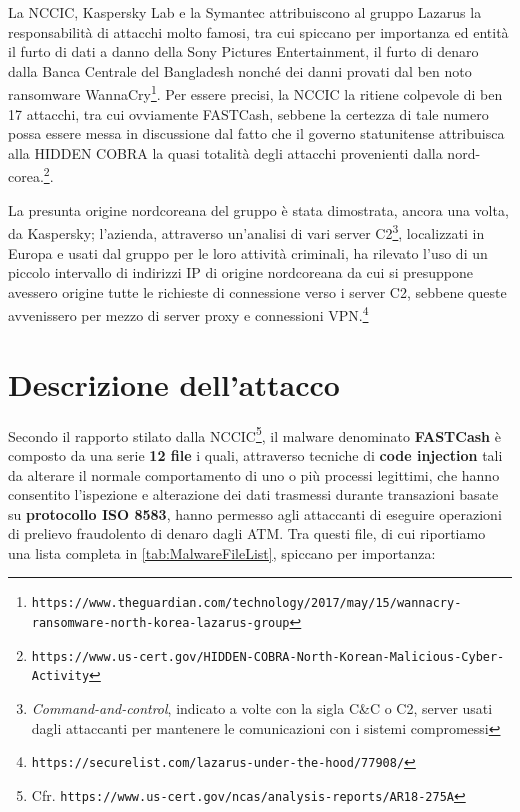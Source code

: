 \documentclass[10pt,a4paper, titlepage]{report}
\begin{document}
La NCCIC, Kaspersky Lab e la Symantec attribuiscono al gruppo Lazarus la responsabilità di attacchi molto famosi, tra cui spiccano per importanza ed entità il furto di dati a danno della Sony Pictures Entertainment, il furto di denaro dalla Banca Centrale del Bangladesh nonché dei danni provati dal ben noto ransomware WannaCry\footnote{\texttt{https://www.theguardian.com/technology/2017/may/15/wannacry-ransomware-north-korea-lazarus-group}}. Per essere precisi, la NCCIC la ritiene colpevole di ben 17 attacchi, tra cui ovviamente FASTCash, sebbene la certezza di tale numero possa essere messa in discussione dal fatto che il governo statunitense attribuisca alla HIDDEN COBRA la quasi totalità degli attacchi provenienti dalla nord-corea.\footnote{\texttt{https://www.us-cert.gov/HIDDEN-COBRA-North-Korean-Malicious-Cyber-Activity}}.

La presunta origine nordcoreana del gruppo è stata dimostrata, ancora una volta, da Kaspersky; l'azienda, attraverso un'analisi di vari server C2\footnote{\textit{Command-and-control}, indicato a volte con la sigla C\&C o C2, server usati dagli attaccanti per mantenere le comunicazioni con i sistemi compromessi}, localizzati in Europa e usati dal gruppo per le loro attività criminali, ha rilevato l'uso di un piccolo intervallo di indirizzi IP di origine nordcoreana da cui si presuppone avessero origine tutte le richieste di connessione verso i server C2, sebbene queste avvenissero per mezzo di server proxy e connessioni VPN.\footnote{\texttt{https://securelist.com/lazarus-under-the-hood/77908/}}


\chapter{Descrizione dell'attacco}


Secondo il rapporto stilato dalla NCCIC\footnote{Cfr. \texttt{https://www.us-cert.gov/ncas/analysis-reports/AR18-275A}}, il malware denominato \textbf{FASTCash} è composto da una serie \textbf{12 file} i quali, attraverso tecniche di \textbf{code injection} tali da alterare il normale comportamento di uno o più processi legittimi, che hanno consentito l'ispezione e alterazione dei dati trasmessi durante transazioni basate su \textbf{protocollo ISO 8583}, hanno permesso agli attaccanti di eseguire operazioni di prelievo fraudolento di denaro dagli ATM.
Tra questi file, di cui riportiamo una lista completa in \ref{tab:MalwareFileList}, spiccano per importanza:
\end{document}
